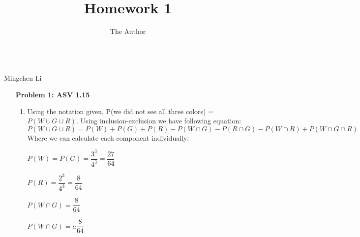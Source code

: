 \documentclass[11pt, oneside]{article}
\title{Homework 1}
\author{The Author}
\begin{document}
\begin{center}\\Mingchen Li\\ \end{center}

\begin{enumerate}
    \item [{\bf Problem 1: ASV 1.15}] 
    \begin{enumerate}
        \item Using the notation given, P(we did not see all three colors) = $P(W\cup G \cup R)$. Using inclusion-exclusion we have following equation: 
        \[P(W\cup G \cup R)= P(W)+P(G)+P(R)-P(W\cap G)-P(R\cap G)-P(W\cap R)+P(W\cap G \cap R)\]
        Where we can calculate each component individually:
        
        $P(W)= P(G)= \dfrac{3^3}{4^3}= \dfrac{27}{64}$
        
        $P(R)=\dfrac{2^3}{4^3}=\dfrac{8}{64}$
        
        $P(W\cap G)=\dfrac{8}{64}$
        
        $P(W\cap G)=a\dfrac{8}{64}$
        
    \end{enumerate}
\end{enumerate}
\end{document}
